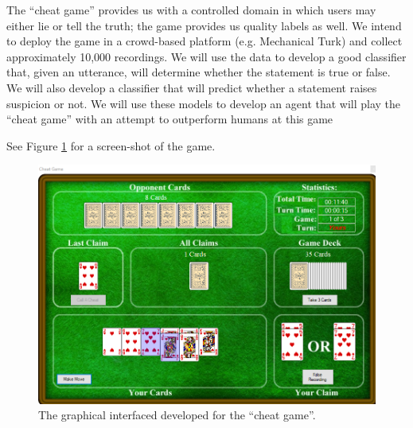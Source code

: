 The ``cheat game'' provides us with a controlled domain in which users may either lie or tell the truth; the game provides us quality labels as well. We intend to deploy the game in a crowd-based platform (e.g. Mechanical Turk) and collect approximately 10,000 recordings. We will use the data to develop a good classifier that, given an utterance, will determine whether the statement is true or false. We will also develop a classifier that will predict whether a statement raises suspicion or not.
We will use these models to develop an agent that will play the ``cheat game'' with an attempt to outperform humans at this game

See Figure \ref{fig:cheatgamegui} for a screen-shot of the game.

\begin{figure}[tbph]
	\centering
	\includegraphics[width=4.5in]{Chapters/cheat_game_GUI}
	\caption{The graphical interfaced developed for the ``cheat game''.}
	\label{fig:cheatgamegui}
\end{figure}






